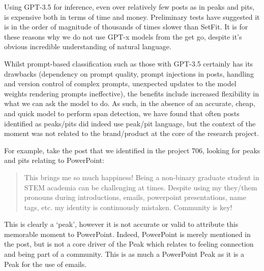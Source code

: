 \documentclass[
  letterpaper,
  DIV=11,
  numbers=noendperiod]{scrreprt}
\begin{document}
\begin{tcolorbox}[enhanced jigsaw, colback=white, opacitybacktitle=0.6, coltitle=black, left=2mm, breakable, bottomtitle=1mm, toptitle=1mm, toprule=.15mm, colframe=quarto-callout-important-color-frame, titlerule=0mm, title=\textcolor{quarto-callout-important-color}{\faExclamation}\hspace{0.5em}{Why not use GPT from the start?}, colbacktitle=quarto-callout-important-color!10!white, rightrule=.15mm, bottomrule=.15mm, arc=.35mm, opacityback=0, leftrule=.75mm]

Using GPT-3.5 for inference, even over relatively few posts as in peaks
and pits, is expensive both in terms of time and money. Preliminary
tests have suggested it is in the order of magnitude of thousands of
times slower than SetFit. It is for these reasons why we do not use
GPT-x models from the get go, despite it's obvious incredible
understanding of natural language.

\end{tcolorbox}

Whilst prompt-based classification such as those with GPT-3.5 certainly
has its drawbacks (dependency on prompt quality, prompt injections in
posts, handling and version control of complex prompts, unexpected
updates to the model weights rendering prompts ineffective), the
benefits include increased flexibility in what we can ask the model to
do. As such, in the absence of an accurate, cheap, and quick model to
perform span detection, we have found that often posts identified as
peaks/pits did indeed use peak/pit language, but the context of the
moment was not related to the brand/product at the core of the research
project.

For example, take the post that we identified in the project 706,
looking for peaks and pits relating to PowerPoint:

\begin{quote}
This brings me so much happiness! Being a non-binary graduate student in
STEM academia can be challenging at times. Despite using my they/them
pronouns during introductions, emails, powerpoint presentations, name
tags, etc. my identity is continuously mistaken. Community is key!
\end{quote}

This is clearly a `peak', however it is not accurate or valid to
attribute this memorable moment to PowerPoint. Indeed, PowerPoint is
merely mentioned in the post, but is not a core driver of the Peak which
relates to feeling connection and being part of a community. This is as
much a PowerPoint Peak as it is a Peak for the use of emails.
\end{document}
